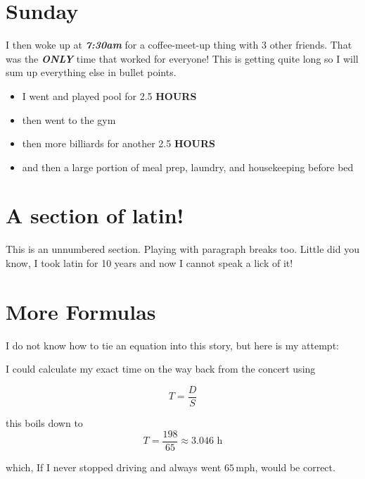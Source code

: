 \documentclass[12pt]{article} %
\begin{document}
\section{Sunday}
I then woke up at \textbf{\textit{7:30am}} for a coffee-meet-up thing with 3 other friends. That was the \emph{\textbf{ONLY}} time that worked for everyone!
This is getting quite long so I will sum up everything else in bullet points.

\begin{itemize}
    \item I went and played pool for 2.5 \textbf{HOURS}
    \item then went to the gym
    \item then more billiards for another 2.5 \textbf{HOURS}
    \item and then a large portion of meal prep, laundry, and housekeeping before bed
\end{itemize}
\section*{A section of latin!}
This is an unnumbered section. Playing with paragraph breaks too.
\bigbreak
Little did you know, I took latin for 10 years and now I cannot speak a lick of it!\\
\lipsum[1]
\section{More Formulas}
I do not know how to tie an equation into this story, but here is my attempt:

I could calculate my exact time on the way back from the concert using

\begin{equation}
    T = \frac{D}{S} \label{eq:time}
\end{equation}

this boils down to 
\[
T = \frac{198}{65} \approx 3.046 \text{ h}
\]

which, If I never stopped driving and always went $65 \, \text{mph}$, would be correct.
\end{document}
